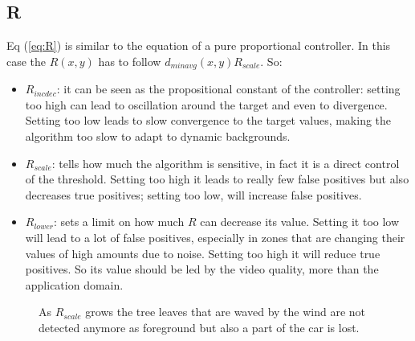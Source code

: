 \subsection*{R}
Eq (\ref{eq:R}) is similar to the equation of a pure proportional controller.
In this case the $R(x,y)$ has to follow $d_{minavg}(x,y)R_{scale}$. So:
\begin{itemize}
    \item $R_{incdec}$: it can be seen as the propositional constant of the controller: setting too high can lead to oscillation around the target and even to divergence. Setting too low leads to slow convergence to the target values, making the algorithm too slow to adapt to dynamic backgrounds.
    \item $R_{scale}$: tells how much the algorithm is sensitive, in fact it is a direct
    control of the threshold. Setting too high it leads to really few false positives
    but also decreases true positives; setting too low, will increase false positives.
    \item $R_{lower}$: sets a limit on how much $R$ can decrease its value. Setting it too
    low will lead to a lot of false positives,
   especially in zones that are changing their values of high amounts due to noise. Setting too
    high it will reduce true positives. So its value should be led by the
    video quality, more than the application domain.
\end{itemize}
\begin{figure}[!t]
    \centering
    \newline
    \newline
    \caption{As $R_{scale}$ grows the tree leaves that are waved by the wind are not detected
anymore as foreground but also a part of the car is lost.}
\end{figure}

